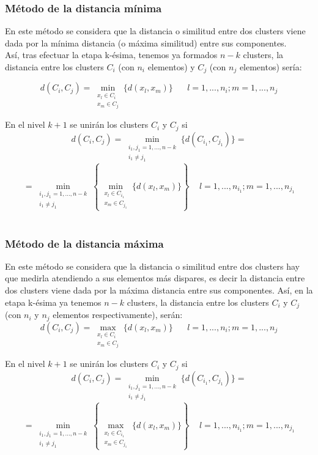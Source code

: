 \documentclass[letterpaper,12pt, spanish]{article}
\begin{document}
 \subsubsection*{Método de la distancia mínima}
 
 En este método se considera que la distancia o similitud entre dos clusters viene dada por la mínima distancia (o máxima similitud) entre sus componentes.
 \ \\
 Así, tras efectuar la etapa k-ésima, tenemos ya formados $n-k$ clusters, la distancia entre los clusters $C_{i}$ (con $n_{i}$ elementos) y $C_{j}$ (con $n_{j}$ elementos) sería:
 
$$d(C_{i},C_{j})= \min_{\substack {x_{l}\in C_{i}\\ x_{m}\in C_{j}}}\{d(x_{l},x_{m})\} \,\,\,\,\,\,\,\,\,\, l=1,...,n_{i}; m=1,...,n_{j}$$   
 
En el nivel $k+1$ se unirán los clusters $C_{i}$ y $C_{j}$ si	
$$d(C_{i},C_{j})= \min_{\substack {i_{1},j_{1}=1,...,n-k\\ i_{1}\neq j_{1}}} \{d(C_{i_{1}},C_{j_{1}})\}=$$
$$=\min_{\substack{i_{1},j_{1}=1,...,n-k\\ i_{1}\neq j_{1}}} \left\{\min_{\substack{x_{l}\in C_{i_{1}}\\ x_{m}\in C_{j_{1}}}} \{d(x_{l},x_{m})\}\right\} \,\,\,\,\,\,\, l=1,...,n_{i_{1}}; m=1,...,n_{j_{1}}$$
\ \\
\subsubsection*{Método de la distancia máxima}

En este método se considera que la distancia o similitud entre dos clusters hay que medirla atendiendo a sus elementos más dispares, es decir la distancia entre dos clusters viene dada por la máxima distancia entre sus componentes.  Así, en la etapa k-ésima ya tenemos $n-k$ clusters, la distancia entre los clusters $C_{i}$ y $C_{j}$ (con $n_{i}$ y $n_{j}$ elementos respectivamente), serán:
$$d(C_{i}, C_{j})=\max_{\substack{x_{l}\in C_{i}\\ x_{m}\in C_{j}}} \{d(x_{l}, x_{m})\} \,\,\,\,\,\,\,\,\,\, l=1,...,n_{i}; m=1,...,n_{j}$$

En el nivel $k+1$ se unirán los clusters $C_{i}$ y $C_{j}$ si 
$$d(C_{i},C_{j})= \min_{\substack {i_{1},j_{1}=1,...,n-k\\ i_{1}\neq j_{1}}} \{d(C_{i_{1}},C_{j_{1}})\}=$$
$$=\min_{\substack{i_{1},j_{1}=1,...,n-k\\ i_{1}\neq j_{1}}} \left\{\max_{\substack{x_{l}\in C_{i_{1}}\\ x_{m}\in C_{j_{1}}}} \{d(x_{l},x_{m})\}\right\} \,\,\,\,\,\,\, l=1,...,n_{i_{1}}; m=1,...,n_{j_{1}}$$
\end{document}
